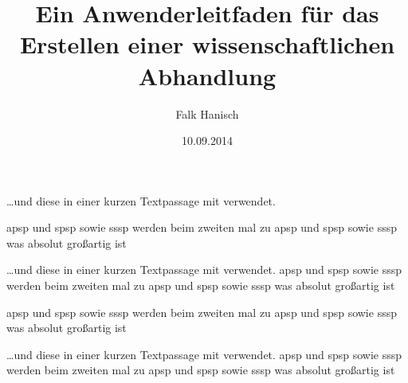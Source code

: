 \documentclass[%
  english,ngerman,%
  geometry=no,DIV=12,automark,%
]{tudscrartcl}
\begin{document}
\title{%
  Ein Anwenderleitfaden für das Erstellen einer wissenschaftlichen Abhandlung%
}
\author{Falk Hanisch}
\date{10.09.2014}
\makeatletter
\begingroup%
  \def\and{, }%
  \let\thanks\@gobble%
  \let\footnote\@gobble%
\endgroup%
\makeatother
%
\begin{Tutorial}
\end{Tutorial}
%
\dots und diese in einer kurzen Textpassage mit  
verwendet.
%
\begin{Tutorial}
\gls{apsp} und \gls{spsp} sowie \gls{sssp} werden beim zweiten mal zu
\gls{apsp} und \gls{spsp} sowie \gls{sssp} was absolut großartig ist
\end{Tutorial}
%
\dots und diese in einer kurzen Textpassage mit  
verwendet.
\gls{apsp} und \gls{spsp} sowie \gls{sssp} werden beim zweiten mal zu
\gls{apsp} und \gls{spsp} sowie \gls{sssp} was absolut großartig ist
%
\begin{Tutorial}
\gls{apsp} und \gls{spsp} sowie \gls{sssp} werden beim zweiten mal zu
\gls{apsp} und \gls{spsp} sowie \gls{sssp} was absolut großartig ist
\end{Tutorial}
%
\dots und diese in einer kurzen Textpassage mit  
verwendet.
\gls{apsp} und \gls{spsp} sowie \gls{sssp} werden beim zweiten mal zu
\gls{apsp} und \gls{spsp} sowie \gls{sssp} was absolut großartig ist
%
\printacronyms
\end{document}
